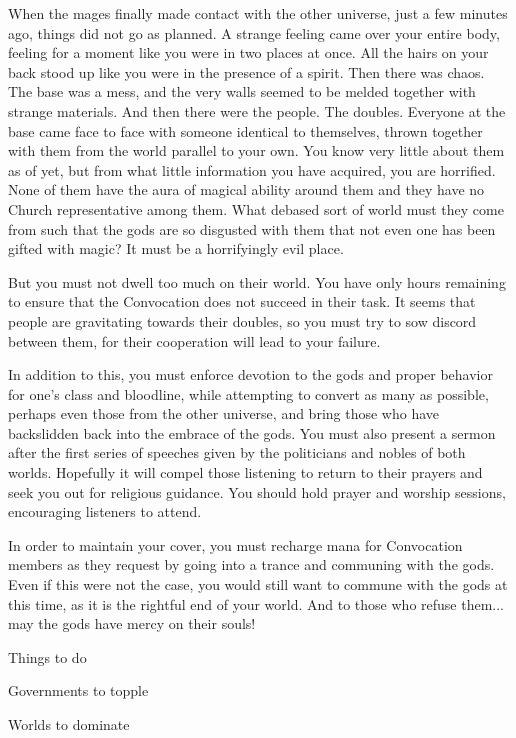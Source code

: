 \documentclass[char]{guildcamp3}
\begin{document}
When the mages finally made contact with the other universe, just a few minutes ago, things did not go as planned. A strange feeling came over your entire body, feeling for a moment like you were in two places at once. All the hairs on your back stood up like you were in the presence of a spirit. Then there was chaos. The base was a mess, and the very walls seemed to be melded together with strange materials. And then there were the people. The doubles. Everyone at the base came face to face with someone identical to themselves, thrown together with them from the world parallel to your own. You know very little about them as of yet, but from what little information you have acquired, you are horrified. None of them have the aura of magical ability around them and they have no Church representative among them. What debased sort of world must they come from such that the gods are so disgusted with them that not even one has been gifted with magic? It must be a horrifyingly evil place.

But you must not dwell too much on their world. You have only hours remaining to ensure that the Convocation does not succeed in their task. It seems that people are gravitating towards their doubles, so you must try to sow discord between them, for their cooperation will lead to your failure.

In addition to this, you must enforce devotion to the gods and proper behavior for one's class and bloodline, while attempting to convert as many as possible, perhaps even those from the other universe, and bring those who have backslidden back into the embrace of the gods. You must also present a sermon after the first series of speeches given by the politicians and nobles of both worlds. Hopefully it will compel those listening to return to their prayers and seek you out for religious guidance. You should hold prayer and worship sessions, encouraging listeners to attend.

In order to maintain your cover, you must recharge mana for Convocation members as they request by going into a trance and communing with the gods. Even if this were not the case, you would still want to commune with the gods at this time, as it is the rightful end of your world. And to those who refuse them... may the gods have mercy on their souls!

\begin{itemz}[Goals]
  \item Things to do
  \item Governments to topple
  \item Worlds to dominate
\end{itemz}
\end{document}
